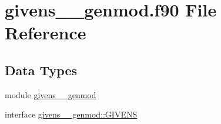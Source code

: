 \hypertarget{givens____genmod_8f90}{\section{givens\+\_\+\+\_\+genmod.\+f90 File Reference}
\label{givens____genmod_8f90}
}
\subsection*{Data Types}
\begin{DoxyCompactItemize}
\item 
module \hyperlink{classgivens____genmod}{givens\+\_\+\+\_\+genmod}
\item 
interface \hyperlink{interfacegivens____genmod_1_1GIVENS}{givens\+\_\+\+\_\+genmod\+::\+G\+I\+V\+E\+N\+S}
\end{DoxyCompactItemize}
